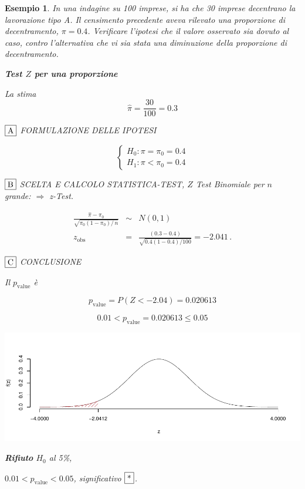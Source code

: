 \documentclass[
  11pt,
]{book}
\theoremstyle{mytheoremstyle}
\theoremstyle{mydefstyle}
\newtheorem{example}{{Esempio}}[section]
\begin{document}
\begin{example}
In una indagine su 100 imprese, si ha che 30 imprese decentrano la
lavorazione tipo A. Il censimento precedente aveva rilevato una
proporzione di decentramento, \(\pi = 0.4\). Verificare l'ipotesi
che il valore osservato sia dovuto al caso, contro
l'alternativa che vi sia stata una diminuzione della proporzione di
decentramento.

\textbf{Test \(Z\) per una proporzione}

La stima
\[\hat\pi=\frac { 30 } { 100 }= 0.3  \]

\(\fbox{A}\) FORMULAZIONE DELLE IPOTESI

\[\begin{cases}
   H_0: \pi = \pi_0=0.4 \\
   H_1: \pi < \pi_0=0.4 
   \end{cases}\]

\(\fbox{B}\) SCELTA E CALCOLO STATISTICA-TEST, \(Z\)
Test Binomiale per \(n\) grande: \(\Rightarrow\) z-Test.

\begin{eqnarray*}
   \frac{\hat\pi - \pi_{0}} {\sqrt {\pi_0(1-\pi_0)/\,n}}&\sim&N(0,1)\\
   z_{\text{obs}}
   &=& \frac{ ( 0.3 -  0.4 )} {\sqrt{ 0.4 (1- 0.4 )/ 100 }}
   =   -2.041 \,.
   \end{eqnarray*}

\(\fbox{C}\) CONCLUSIONE

Il \(p_{\text{value}}\) è

\[ p_{\text{value}} = P(Z<-2.04)=0.020613 \]

\[
 0.01 < p_\text{value}= 0.020613 \leq 0.05 
\]

\begin{center}\includegraphics{Appunti_di_Statistica_2025_files/figure-latex/15-test-mu-pi-12,-1} \end{center}

\textbf{Rifiuto} \(H_0\) al 5\%,

\(0.01<p_\text{value}<0.05\), \emph{significativo} \(\fbox{*}\).
\end{example}
\end{document}
